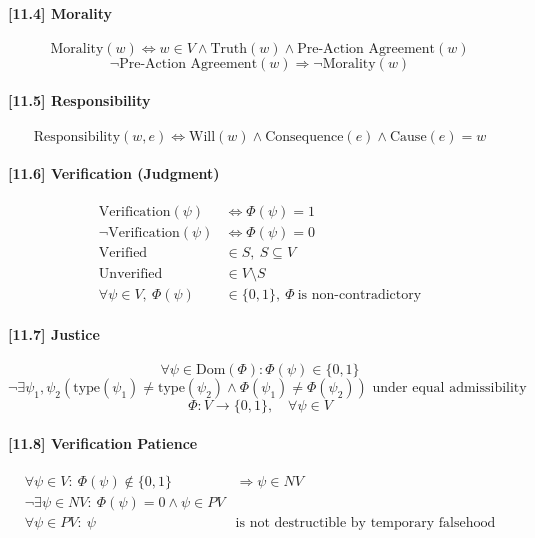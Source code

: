 \documentclass[12pt]{article}
\begin{document}
\paragraph{[11.4] Morality}
\[
\text{Morality}(w) \iff w \in V \land \text{Truth}(w) \land \text{Pre-Action Agreement}(w)
\]
\[
\neg \text{Pre-Action Agreement}(w) \Rightarrow \neg \text{Morality}(w)
\]

\paragraph{[11.5] Responsibility}
\[
\text{Responsibility}(w, e) \iff \text{Will}(w) \land \text{Consequence}(e) \land \text{Cause}(e) = w
\]

\paragraph{[11.6] Verification (Judgment)}
\begin{align*}
\text{Verification}(\psi) &\iff \Phi(\psi) = 1 \\
\neg \text{Verification}(\psi) &\iff \Phi(\psi) = 0 \\
\text{Verified} &\in S,\ S \subseteq V \\
\text{Unverified} &\in V \setminus S \\
\forall \psi \in V,\ \Phi(\psi) &\in \{0,1\},\ \Phi\ \text{is non-contradictory}
\end{align*}

\paragraph{[11.7] Justice}
\[
\forall \psi \in \text{Dom}(\Phi): \Phi(\psi) \in \{0,1\}
\]
\[
\neg \exists \psi_1, \psi_2 \left( \text{type}(\psi_1) \ne \text{type}(\psi_2) \land \Phi(\psi_1) \ne \Phi(\psi_2) \right) \text{ under equal admissibility}
\]
\[
\Phi : V \rightarrow \{0,1\},\quad \forall \psi \in V
\]

\paragraph{[11.8] Verification Patience}
\begin{align*}
\forall \psi \in V:\ \Phi(\psi) \notin \{0,1\} &\Rightarrow \psi \in NV \\
\neg \exists \psi \in NV:\ \Phi(\psi) = 0 \land \psi \in PV \\
\forall \psi \in PV:\ \psi\ &\text{is not destructible by temporary falsehood}
\end{align*}
\end{document}
